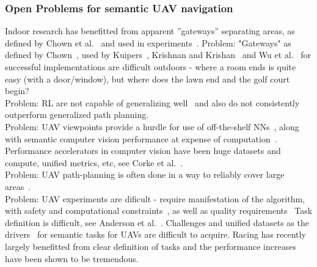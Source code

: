 \documentclass[twocolumn,letterpaper]{IEEEAerospaceCLS}  %
\begin{document}
\subsubsection{Open Problems for semantic UAV navigation}
Indoor research has benefitted from apparent ''gateways'' separating areas, as defined by Chown et al.~\cite{chown_prototypes_1995} and used in experiments~\cite{krishnan_visual_2010,kuipers_local_2004,wu_learning_2018}.
Problem: "Gateways" as defined by Chown~\cite{chown_prototypes_1995}, used by Kuipers~\cite{kuipers_local_2004}, Krishnan and Krishan~\cite{krishnan_visual_2010} and Wu et al.~\cite{wu_learning_2018} for successful implementations are difficult outdoors - where a room ends is quite easy (with a door/window), but where does the lawn end and the golf court begin? \\
Problem: RL are not capable of generalizing well~\cite{chaplot_object_2020} and also do not consistently outperform generalized path planning.\\
Problem: UAV viewpoints provide a hurdle for use of off-the-shelf NNs~\cite{richardwebster_psyphy:_2019}, along with semantic computer vision performance at expense of computation~\cite{boroujerdian_mavbench_2018}. Performance accelerators in computer vision have been huge datasets and compute, unified metrics, etc, see Corke et al.~\cite{corke_what_2020}.\\
Problem: UAV path-planning is often done in a way to reliably cover large areas~\cite{vanegas_novel_2018}.\\
Problem: UAV experiments are dificult - require manifestation of the algorithm, with safety and computational constraints~\cite{mandel_method_2020}, as well as quality requirements~\cite{boroujerdian_mavbench_2018,malatova_how_2020}
Task definition is difficult, see Anderson et al.~\cite{anderson_evaluation_2018}.
Challenges and unified datasets as the drivers~\cite{corke_what_2020} for semantic tasks for UAVs are difficult to acquire. Racing has recently largely benefitted from clear definition of tasks and the performance increases have been shown to be tremendous.
\end{document}
